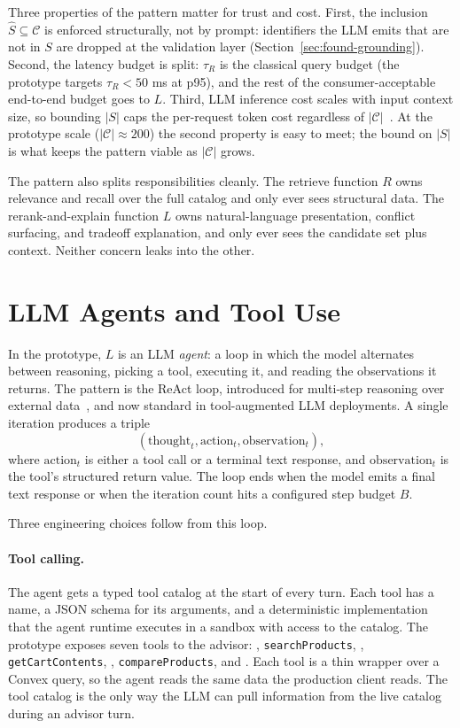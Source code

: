 Three properties of the pattern matter for trust and cost.
First, the inclusion $\hat{S} \subseteq \mathcal{C}$ is enforced
structurally, not by prompt: identifiers the LLM emits that are
not in $S$ are dropped at the validation layer
(Section~\ref{sec:found-grounding}). Second, the latency budget
is split: $\tau_R$ is the classical query budget (the prototype
targets $\tau_R < 50$ ms at p95), and the rest of the
consumer-acceptable end-to-end budget goes to $L$. Third, LLM
inference cost scales with input context size, so bounding $|S|$
caps the per-request token cost regardless of
$|\mathcal{C}|$~\cite{HSTU2024}. At the prototype scale
($|\mathcal{C}| \approx 200$) the second property is easy to
meet; the bound on $|S|$ is what keeps the pattern viable as
$|\mathcal{C}|$ grows.

The pattern also splits responsibilities cleanly. The retrieve
function $R$ owns relevance and recall over the full catalog and
only ever sees structural data. The rerank-and-explain function
$L$ owns natural-language presentation, conflict surfacing, and
tradeoff explanation, and only ever sees the candidate set plus
context. Neither concern leaks into the other.

\section{LLM Agents and Tool Use}
\label{sec:found-agents}

In the prototype, $L$ is an LLM \emph{agent}: a loop in which the
model alternates between reasoning, picking a tool, executing it,
and reading the observations it returns. The pattern is the
ReAct loop, introduced for multi-step reasoning over external
data~\cite{ReAct2022}, and now standard in tool-augmented LLM
deployments. A single iteration produces a
triple~\cite{ReAct2022}
\begin{equation}
  (\mathrm{thought}_t, \mathrm{action}_t, \mathrm{observation}_t),
  \label{eq:react-triple}
\end{equation}
where $\mathrm{action}_t$ is either a tool call or a terminal
text response, and $\mathrm{observation}_t$ is the tool's
structured return value. The loop ends when the model emits a
final text response or when the iteration count hits a configured
step budget $B$.

Three engineering choices follow from this loop.

\paragraph{Tool calling.} The agent gets a typed tool catalog at
the start of every turn. Each tool has a name, a JSON schema for
its arguments, and a deterministic implementation that the agent
runtime executes in a sandbox with access to the catalog. The
prototype exposes seven tools to the advisor:
, \texttt{searchProducts},
, \texttt{getCartContents},
, \texttt{compareProducts}, and
. Each tool is a thin wrapper over a
Convex query, so the agent reads the same data the production
client reads. The tool catalog is the only way the LLM can pull
information from the live catalog during an advisor turn.

